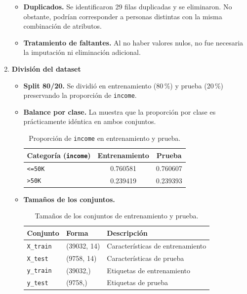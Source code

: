 \documentclass[12pt,a4paper]{article}
\begin{document}
\begin{enumerate}
\begin{itemize}
      \item \textbf{Duplicados.} Se identificaron 29 filas duplicadas y se eliminaron. No obstante, podrían corresponder a personas 
      distintas con la misma combinación de atributos.

      \item \textbf{Tratamiento de faltantes.} Al no haber valores nulos, no fue necesaria la imputación ni eliminación adicional.
    \end{itemize}

    \item \textbf{División del dataset}
    \begin{itemize}
      \item \textbf{Split 80/20.} Se dividió en entrenamiento (80\,\%) y prueba (20\,\%) preservando la proporción de \texttt{income}.
      \item \textbf{Balance por clase.} La  muestra que la proporción por clase es prácticamente idéntica en ambos conjuntos.

      \begin{table}[H]
        \centering
        \begin{tabular}{@{}lS[table-format=1.6]S[table-format=1.6]@{}}
          \toprule
          \textbf{Categoría (\texttt{income})} & \textbf{Entrenamiento} & \textbf{Prueba} \\
          \midrule
          \texttt{<=50K} & 0.760581 & 0.760607 \\
          \texttt{>50K}  & 0.239419 & 0.239393 \\
          \bottomrule
        \end{tabular}
        \caption{Proporción de \texttt{income} en entrenamiento y prueba.}
        \label{tab:income_proportion}
      \end{table}

      \item \textbf{Tamaños de los conjuntos.}
      \begin{table}[H]
        \centering
        \begin{tabular}{@{}lll@{}}
          \toprule
          \textbf{Conjunto} & \textbf{Forma} & \textbf{Descripción} \\
          \midrule
          \texttt{X\_train} & (39032, 14) & Características de entrenamiento \\
          \texttt{X\_test}  & (9758, 14)  & Características de prueba \\
          \texttt{y\_train} & (39032,)    & Etiquetas de entrenamiento \\
          \texttt{y\_test}  & (9758,)     & Etiquetas de prueba \\
          \bottomrule
        \end{tabular}
        \caption{Tamaños de los conjuntos de entrenamiento y prueba.}
        \label{tab:train_test_shapes}
      \end{table}
    \end{itemize}


\end{enumerate}
\end{document}
